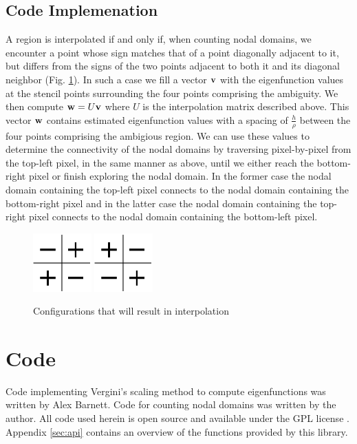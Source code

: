 \documentclass{report}
\begin{document}
\subsection{Code Implemenation}
A region is interpolated if and only if, when counting nodal domains, we encounter a point whose sign matches that of a point diagonally adjacent to it, but differs from the signs of the two points adjacent to both it and its diagonal neighbor (Fig. \ref{fig:trouble_spot}). In such a case we fill a vector ${\bf v}$ with the eigenfunction values at the stencil points surrounding the four points comprising the ambiguity. We then compute ${\bf w} = U {\bf v}$ where $U$ is the interpolation matrix described above. This vector ${\bf w}$ contains estimated eigenfunction values with a spacing of $\frac{h}{\rho}$ between the four points comprising the ambigious region. We can use these values to determine the connectivity of the nodal domains by traversing pixel-by-pixel from the top-left pixel, in the same manner as above, until we either reach the bottom-right pixel or finish exploring the nodal domain. In the former case the nodal domain containing the top-left pixel connects to the nodal domain containing the bottom-right pixel and in the latter case the nodal domain containing the top-right pixel connects to the nodal domain containing the bottom-left pixel.

\begin{figure}
  \begin{center}
    \includegraphics[width=0.2\textwidth]{figs/interpolation/trouble_spot1.eps}
    \hspace{1 cm} 
    \includegraphics[width=0.2\textwidth]{figs/interpolation/trouble_spot2.eps}
    \caption{Configurations that will result in interpolation}
    \label{fig:trouble_spot}
  \end{center}
\end{figure}

\section{Code}
Code implementing Vergini's scaling method to compute eigenfunctions was written by Alex Barnett. Code for counting nodal domains was written by the author. All code used herein is open source and available under the GPL license \cite{gpl} \cite{github}. Appendix \ref{sec:api} contains an overview of the functions provided by this library.
\end{document}
